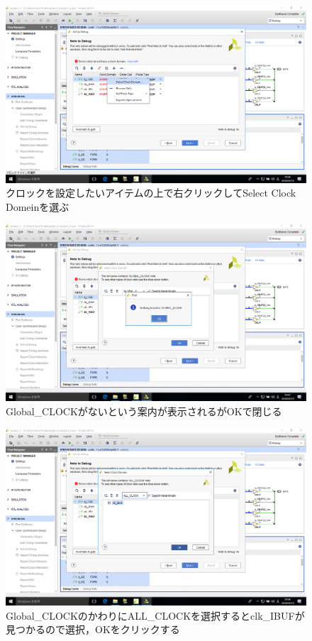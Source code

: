 \documentclass[a4paper,dvipdfmx]{jsarticle}
\begin{document}
 \begin{figure}[H]
  \begin{center}
   \includegraphics[width=.8\textwidth]{chapter08_figures/VirtualBox_Windows10_19_03_2018_23_56_17.png}
  \end{center}
  \caption{クロックを設定したいアイテムの上で右クリックしてSelect Clock Domeinを選ぶ}
 \end{figure}

 \begin{figure}[H]
  \begin{center}
   \includegraphics[width=.8\textwidth]{chapter08_figures/VirtualBox_Windows10_19_03_2018_23_56_29.png}
  \end{center}
  \caption{Global\_CLOCKがないという案内が表示されるがOKで閉じる}
 \end{figure}

 \begin{figure}[H]
  \begin{center}
   \includegraphics[width=.8\textwidth]{chapter08_figures/VirtualBox_Windows10_19_03_2018_23_56_30.png}
  \end{center}
  \caption{Global\_CLOCKのかわりにALL\_CLOCKを選択するとclk\_IBUFが見つかるので選択，OKをクリックする}
 \end{figure}
\end{document}
